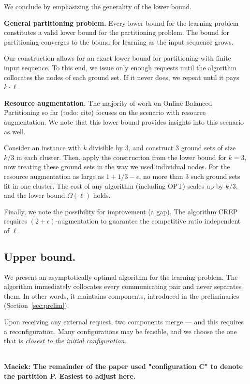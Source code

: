 \documentclass[manuscript,screen=true, review, anonymous]{acmart}
\newcommand{\OPT}{\textsf{OPT}\xspace}
\newcommand\maciek[1]{\color{brown}\textbf{\\ Maciek: #1}\color{black}}
\begin{document}
We conclude by emphasizing the generality of the lower bound.

\noindent
\textbf{General partitioning problem.}
Every lower bound for the learning problem constitutes a valid lower bound for the partitioning problem.
The bound for partitioning converges to the bound for learning as the input sequence grows.

Our construction allows for an exact lower bound for partitioning with finite input sequence.
To this end, we issue only enough requests until the algorithm collocates the nodes of each ground set.
If it never does, we repeat until it pays $k\cdot \ell$.


\noindent
\textbf{Resource augmentation.}
The majority of work on Online Balanced Partitioning so far (todo: cite) focuses on the scenario with resource augmentation.
We note that this lower bound provides insights into this scenario as well.

Consider an instance with $k$ divisible by $3$, and construct $3$ ground sets of size $k/3$ in each cluster.
Then, apply the construction from the lower bound for $k=3$, now treating these ground sets in the way we used individual nodes.
For the resource augmentation as large as $1+1/3-\epsilon$, no more than $3$ such ground sets fit in one cluster.
The cost of any algorithm (including \OPT) scales up by $k/3$, and the lower bound $\Omega(\ell)$ holds.

Finally, we note the possibility for improvement (a gap). The algorithm CREP~\cite{repartition-disc} requires $(2+\epsilon)$-augmentation to guarantee the competitive ratio independent of $\ell$.

\subsection{Upper bound.}
\label{sec:ppl}

We present an asymptotically optimal algorithm for the learning problem.
The algorithm immediately collocates every communicating pair and never separates them.
In other words, it maintains components, introduced in the preliminaries (Section~\ref{sec:prelim}).

Upon receiving any external request, two components merge --- and this requires a reconfiguration.
Many configurations may be feasible, and we choose the one that is \emph{closest to the initial configuration}.

\maciek{The remainder of the paper used "configuration C" to denote the partition P. Easiest to adjust here.}
\end{document}
